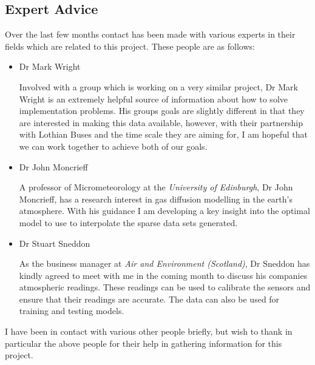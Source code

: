 \subsection{Expert Advice}\label{expertadvie}

Over the last few months contact has been made with various experts in their fields which are related to this project. These people are as follows:

\begin{itemize}

\item Dr Mark Wright

Involved with a group which is working on a very similar project, Dr Mark Wright is an extremely helpful source of information about how to solve implementation problems. His groups goals are slightly different in that they are interested in making this data available, however, with their partnership with Lothian Buses and the time scale they are aiming for, I am hopeful that we can work together to achieve both of our goals. 

\item Dr John Moncrieff 

A professor of Micrometeorology at the \emph{University of Edinburgh}, Dr John Moncrieff, has a research interest in gas diffusion modelling in the earth's atmosphere. With his guidance I am developing a key insight into the optimal model to use to interpolate the sparse data sets generated. 

\item Dr Stuart Sneddon

As the business manager at \emph{Air and Environment (Scotland)}, Dr Sneddon has kindly agreed to meet with me in the coming month to discuss his companies atmospheric readings. These readings can be used to calibrate the sensors and ensure that their readings are accurate. The data can also be used for training and testing models. 

\end{itemize}

I have been in contact with various other people briefly, but wish to thank in particular the above people for their help in gathering information for this project.
